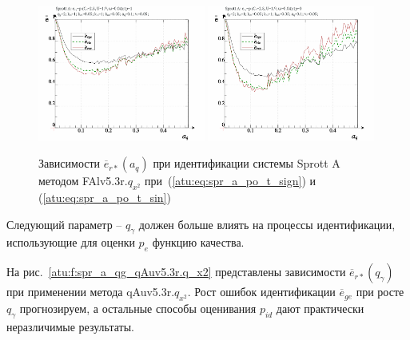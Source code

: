 \begin{figure}[h!]
  \centerline{
    \includegraphics[width=0.49\textwidth]{p/cha/spr_a/FAlv5.3A/sprott_a_FAlv5x3r-p_a_q_e_sign.png}
    \hfill
    \includegraphics[width=0.49\textwidth]{p/cha/spr_a/FAlv5.3A/sprott_a_FAlv5x3r-p_a_q_e_sin.png}
  }
  \caption{Зависимости $\overline{e}_{r*}(a_q)$ при идентификации системы Sprott A методом FAlv5.3r.$q_{x^2}$
   при~(\ref{atu:eq:spr_a_po_t_sign}) и (\ref{atu:eq:spr_a_po_t_sin})}
  \label{atu:f:spr_a_a_q_FAlv5.3r.q_x2}
\end{figure}

Следующий параметр -- $q_\gamma$ должен больше влиять на процессы идентификации,
использующие для оценки $p_e$ функцию качества.

На рис.~\ref{atu:f:spr_a_qg_qAuv5.3r.q_x2} представлены зависимости
$\overline{e}_{r*}(q_\gamma)$ при применении метода qAuv5.3r.$q_{x^2}$.
Рост ошибок идентификации $\overline{e}_{ge}$ при росте $q_\gamma$
прогнозируем, а остальные способы оценивания $p_{id}$
дают практически неразличимые результаты.

